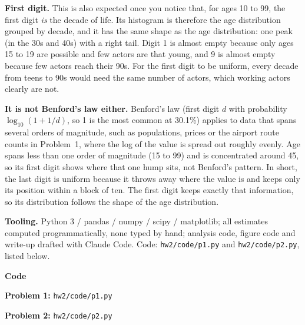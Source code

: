 \documentclass[11pt]{article}
\begin{document}
\begin{itemize}
{    \medskip
    \textbf{First digit.} This is also expected once you notice that, for ages 10 to 99,
    the first digit \emph{is} the decade of life. Its histogram is therefore the age
    distribution grouped by decade, and it has the same shape as the age distribution:
    one peak (in the 30s and 40s) with a right tail. Digit 1 is almost empty because
    only ages 15 to 19 are possible and few actors are that young, and 9 is almost empty
    because few actors reach their 90s. For the first digit to be uniform, every decade
    from teens to 90s would need the same number of actors, which working actors clearly
    are not.

    \medskip
    \textbf{It is not Benford's law either.} Benford's law (first digit $d$ with
    probability $\log_{10}(1 + 1/d)$, so 1 is the most common at 30.1\%) applies to data
    that spans several orders of magnitude, such as populations, prices or the airport
    route counts in Problem~1, where the log of the value is spread out roughly evenly.
    Age spans less than one order of magnitude (15 to 99) and is concentrated around 45,
    so its first digit shows where that one hump sits, not Benford's pattern. In short,
    the last digit is uniform because it throws away where the value is and keeps only
    its position within a block of ten. The first digit keeps exactly that information,
    so its distribution follows the shape of the age distribution.}
\end{itemize}

\bigskip
\textbf{Tooling.} Python 3 / pandas / numpy / scipy / matplotlib; all estimates computed
programmatically, none typed by hand; analysis code, figure code and write-up drafted
with Claude Code. Code: \texttt{hw2/code/p1.py} and \texttt{hw2/code/p2.py}, listed below.

\clearpage
\textbf{Code}

\medskip
\textbf{Problem 1:} \texttt{hw2/code/p1.py}


\textbf{Problem 2:} \texttt{hw2/code/p2.py}

\end{document}
